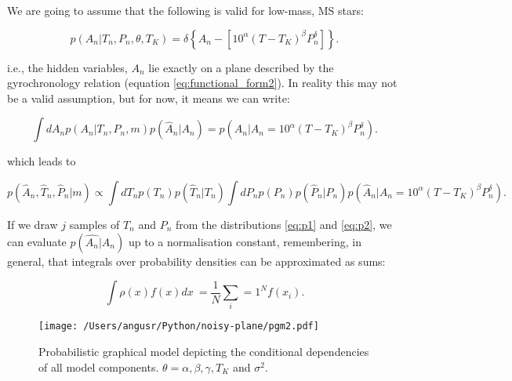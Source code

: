 \documentclass[12pt,preprint]{aastex}
\begin{document}
We are going to assume that the following is valid for low-mass, MS stars:

\begin{equation}
p(A_n|T_n,P_n,\theta,T_K) = \delta \left\{ A_n - \left[ 10^\alpha \left(T-T_K \right)^\beta P_n^\delta \right] \right\}.
\end{equation}

i.e., the hidden variables, $A_n$ lie exactly on a plane described by the gyrochronology relation (equation \ref{eq:functional_form2}).
In reality this may not be a valid assumption, but for now, it means we can write:

\begin{equation}
  \int{dA_n p(A_n | T_n, P_n, m) p(\hat{A}_n | A_n)}
  = p(\hat{A}_n | A_n = 10^\alpha (T-T_K)^\beta P_n^\delta) .
\end{equation}

which leads to

\begin{equation}
  p(\hat{A}_n, \hat{T}_n, \hat{P}_n | m) \propto
    \int dT_n p(T_n) p(\hat{T}_n | T_n) \int dP_n p(P_n) p(\hat{P}_n | P_n)
    p(\hat{A}_n | A_n = 10^\alpha (T-T_K)^\beta P_n^\delta) .
\end{equation}

If we draw $j$ samples of $T_n$ and $P_n$ from the distributions \ref{eq:p1} and \ref{eq:p2}, we can evaluate $p(\hat{A_n}|A_n)$ up to a normalisation constant, remembering, in general, that integrals over probability densities can be approximated as sums:

\begin{equation}
  \int{\rho(x) f(x) dx ~= \frac{1}{N} \sum_i=1^N f(x_i)} .
  \label{eq:example}
\end{equation}

\begin{figure}[ht]
\begin{center}
\texttt{[image: /Users/angusr/Python/noisy-plane/pgm2.pdf]}
\caption{Probabilistic graphical model depicting the conditional dependencies of all model components. $\theta = \alpha, \beta, \gamma, T_K$ and $\sigma^2$.}
\label{fig:results}
\end{center}
\end{figure}
\end{document}
